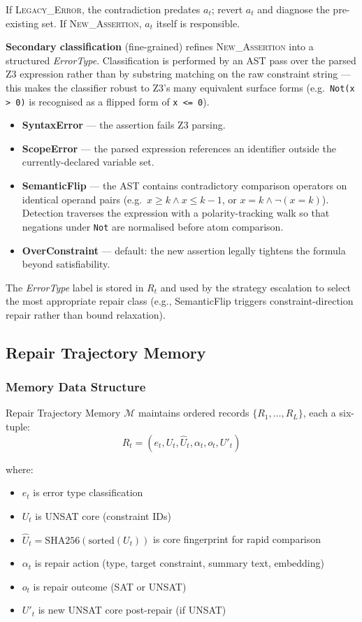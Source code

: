 If \textsc{Legacy\_Error}, the contradiction predates $a_t$; revert $a_t$ and diagnose the pre-existing set.  If \textsc{New\_Assertion}, $a_t$ itself is responsible.

\textbf{Secondary classification} (fine-grained) refines \textsc{New\_Assertion} into a structured \textit{ErrorType}. Classification is performed by an AST pass over the parsed Z3 expression rather than by substring matching on the raw constraint string — this makes the classifier robust to Z3's many equivalent surface forms (e.g.\ \texttt{Not(x > 0)} is recognised as a flipped form of \texttt{x <= 0}).
\begin{itemize}
    \item \textbf{SyntaxError} — the assertion fails Z3 parsing.
    \item \textbf{ScopeError} — the parsed expression references an identifier outside the currently-declared variable set.
    \item \textbf{SemanticFlip} — the AST contains contradictory comparison operators on identical operand pairs (e.g.\ $x \geq k \wedge x \leq k\!-\!1$, or $x = k \wedge \neg(x = k)$). Detection traverses the expression with a polarity-tracking walk so that negations under \texttt{Not} are normalised before atom comparison.
    \item \textbf{OverConstraint} — default: the new assertion legally tightens the formula beyond satisfiability.
\end{itemize}

The \textit{ErrorType} label is stored in $R_t$ and used by the strategy escalation to select the most appropriate repair class (e.g., SemanticFlip triggers constraint-direction repair rather than bound relaxation).

\subsection{Repair Trajectory Memory}

\subsubsection{Memory Data Structure}

Repair Trajectory Memory $\mathcal{M}$ maintains ordered records $\{R_1, \ldots, R_L\}$, each a six-tuple:
$$R_t = (e_t, U_t, \hat{U}_t, \alpha_t, o_t, U'_t)$$

where:
\begin{itemize}
    \item $e_t$ is error type classification
    \item $U_t$ is UNSAT core (constraint IDs)
    \item $\hat{U}_t = \text{SHA256}(\text{sorted}(U_t))$ is core fingerprint for rapid comparison
    \item $\alpha_t$ is repair action (type, target constraint, summary text, embedding)
    \item $o_t$ is repair outcome (SAT or UNSAT)
    \item $U'_t$ is new UNSAT core post-repair (if UNSAT)
\end{itemize}

